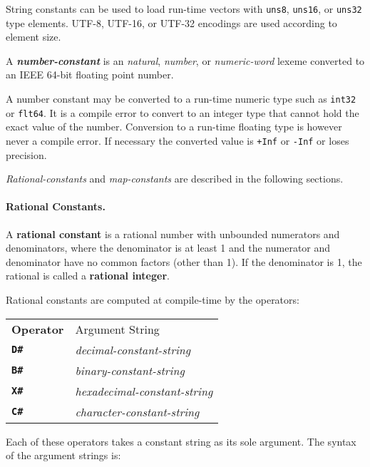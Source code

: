 \documentclass[12pt]{article}
\newcommand{\subsubsubsection}[1]{\paragraph[#1]{#1.}}
\newcommand{\TT}[1]{{\tt \bfseries #1}}
\newcommand{\key}[1]{{\rm \bfseries #1}}
\newcommand{\emkey}[1]{{\em \bfseries #1}}
\begin{document}
String constants can be used to load run-time vectors
with {\tt uns8}, {\tt uns16}, or {\tt uns32} type elements.
UTF-8, UTF-16, or UTF-32 encodings are used according to element
size.

A \emkey{number-constant} is an {\em natural}, {\em number},
or {\em numeric-word} lexeme converted to an IEEE 64-bit floating
point number.

A number constant may be converted to a run-time
numeric type such as {\tt int32} or {\tt flt64}.
It is a compile error to convert to an integer type that cannot
hold the exact value of the number.
Conversion to a run-time floating type is however
never a compile error.  If necessary the converted value is
{\tt +Inf} or {\tt -Inf} or loses precision.

{\em Rational-constants} and {\em map-constants} are described in the
following sections.


\subsubsubsection{Rational Constants}
\label{RATIONAL-CONSTANTS}

A \key{rational constant} is a rational number with unbounded
numerators and denominators, where the
denominator is at least 1 and the numerator and denominator
have no common factors (other than 1).  If the denominator is 1, the
rational is called a \key{rational integer}.

Rational constants are computed at compile-time by the operators:
\begin{center}
\begin{tabular}{ll}
\bf Operator	& Argument String
\\[1ex]
\TT{D\#}	& {\em decimal-constant-string} \\
\TT{B\#}	& {\em binary-constant-string} \\
\TT{X\#}	& {\em hexadecimal-constant-string} \\
\TT{C\#}	& {\em character-constant-string} \\
\end{tabular}
\end{center}

Each of these operators takes a constant string as its sole argument.
The syntax of the argument strings is:
\end{document}
